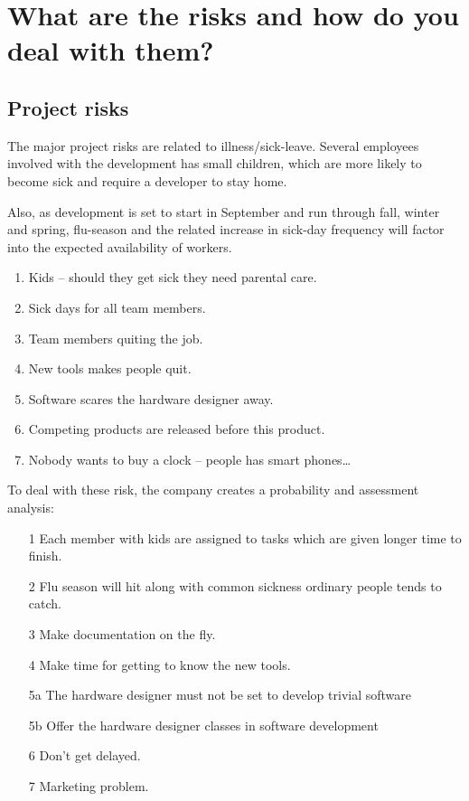 \documentclass[Main]{subfiles}
\begin{document}
\section{What are the risks and how do you deal with them?}

\subsection{Project risks} %
\label{sub:project_risks}

The major project risks are related to illness/sick-leave.
Several employees involved with the development has small children, which are more likely to become sick and require a developer to stay home.

Also, as development is set to start in September and run through fall, winter and spring, flu-season and the related increase in sick-day frequency will factor into the expected availability of workers.





\begin{enumerate}
	\item Kids -- should they get sick they need parental care.
	\item Sick days for all team members.
	\item Team members quiting the job.
	\item New tools makes people quit.
	\item Software scares the hardware designer away.
	\item Competing products are released before this product.
	\item Nobody wants to buy a clock -- people has smart phones\dots
\end{enumerate}
To deal with these risk, the company creates a probability and assessment analysis:

\begin{itemize}
	\item[1] Each member with kids are assigned to tasks which are given longer time to finish.
	\item[2] Flu season will hit along with common sickness ordinary people tends to catch.
	\item[3] Make documentation on the fly.
	\item[4] Make time for getting to know the new tools.
	\item[5a] The hardware designer must not be set to develop trivial software
	\item[5b] Offer the hardware designer classes in software development
	\item[6] Don't get delayed.
	\item[7] Marketing problem.
\end{itemize}
\end{document}
